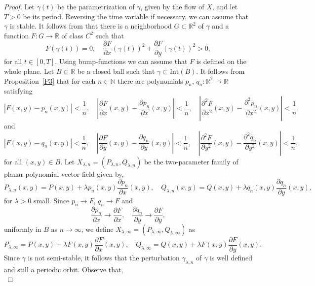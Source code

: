 \documentclass[11pt]{amsart}
\begin{document}
\begin{proof} Let $\gamma(t)$ be the parametrization of $\gamma$, given by the flow of $X$, and let $T>0$ be its period. Reversing the time variable if necessary, we can assume that $\gamma$ is stable. It follows from \cite[p. 124]{And1971} that there is a neighborhood $G\subset\mathbb{R}^2$ of $\gamma$ and a function $F\colon G\to\mathbb{R}$ of class $C^2$ such that
\begin{equation}\label{4}
	F(\gamma(t))=0, \quad \frac{\partial F}{\partial x}(\gamma(t))^2+\frac{\partial F}{\partial y}(\gamma(t))^2>0,
\end{equation}
for all $t\in[0,T]$. Using bump-functions we can assume that $F$ is defined on the whole plane. Let $B\subset\mathbb{R}$ be a closed ball such that $\gamma\subset\text{Int}(B)$. It follows from Proposition~\ref{P3} that for each $n\in\mathbb{N}$ there are polynomials $p_n$, $q_n\colon\mathbb{R}^2\to\mathbb{R}$ satisfying
	\[|F(x,y)-p_n(x,y)|<\frac{1}{n}, \quad \left|\frac{\partial F}{\partial x}(x,y)-\frac{\partial p_n}{\partial x}(x,y)\right|<\frac{1}{n}, \quad \left|\frac{\partial^2 F}{\partial x^2}(x,y)-\frac{\partial^2 p_n}{\partial x^2}(x,y)\right|<\frac{1}{n},\]
and
	\[|F(x,y)-q_n(x,y)|<\frac{1}{n}, \quad \left|\frac{\partial F}{\partial y}(x,y)-\frac{\partial q_n}{\partial y}(x,y)\right|<\frac{1}{n}, \quad \left|\frac{\partial^2 F}{\partial y^2}(x,y)-\frac{\partial^2 q_n}{\partial y^2}(x,y)\right|<\frac{1}{n},\]
for all $(x,y)\in B$. Let $X_{\lambda,n}=(P_{\lambda,n},Q_{\lambda,n})$ be the two-parameter family of planar polynomial vector field given by,
	\[P_{\lambda,n}(x,y)=P(x,y)+\lambda p_n(x,y)\frac{\partial p_n}{\partial x}(x,y), \quad Q_{\lambda,n}(x,y)=Q(x,y)+\lambda q_n(x,y)\frac{\partial q_n}{\partial y}(x,y),\]
for $\lambda>0$ small. Since $p_n\to F$, $q_n\to F$ and
	\[\frac{\partial p_n}{\partial x}\to\frac{\partial F}{\partial x}, \quad \frac{\partial q_n}{\partial y}\to\frac{\partial F}{\partial y},\]
uniformly in $B$ as $n\to\infty$, we define $X_{\lambda,\infty}=(P_{\lambda,\infty},Q_{\lambda,\infty})$ as
\begin{equation}\label{21}
	P_{\lambda,\infty}=P(x,y)+\lambda F(x,y)\frac{\partial F}{\partial x}(x,y), \quad Q_{\lambda,\infty}=Q(x,y)+\lambda F(x,y)\frac{\partial F}{\partial y}(x,y).
\end{equation}
Since $\gamma$ is not semi-stable, it follows that the perturbation $\gamma_{\lambda,n}$ of $\gamma$ is well defined and still a periodic orbit. Observe that,
\begin{equation}\label{6}

\end{equation}
\end{proof}
\end{document}
